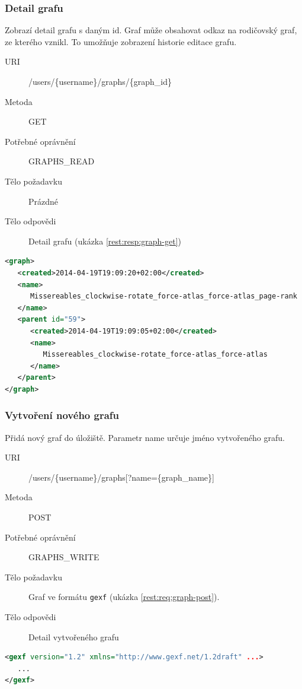 \documentclass[thesis=M,czech]{FITthesis}[2014/05/6]
\begin{document}
\subsubsection{Detail grafu}
Zobrazí detail grafu s daným id. Graf může obsahovat odkaz na rodičovský graf, ze kterého vznikl. To umožňuje zobrazení historie editace grafu.
\begin{description}
  \item[URI] /users/\{username\}/graphs/\{graph\_id\}
  \item[Metoda] GET
  \item[Potřebné oprávnění] GRAPHS\_READ
  \item[Tělo požadavku] Prázdné
  \item[Tělo odpovědi] Detail grafu (ukázka \ref{rest:resp:graph-get})
\end{description}

\begin{lstlisting}[caption=Tělo odpovědi zdroje /users/\{username\}/graphs/\{graph\_id\} (GET), label=rest:resp:graph-get, language=xml]
<graph>
   <created>2014-04-19T19:09:20+02:00</created>
   <name>
      Missereables_clockwise-rotate_force-atlas_force-atlas_page-rank
   </name>
   <parent id="59">
      <created>2014-04-19T19:09:05+02:00</created>
      <name>
         Missereables_clockwise-rotate_force-atlas_force-atlas
      </name>
   </parent>
</graph>
\end{lstlisting}  

\subsubsection{Vytvoření nového grafu}
Přidá nový graf do úložiště. Parametr name určuje jméno vytvořeného grafu.
\begin{description}
  \item[URI] /users/\{username\}/graphs[?name=\{graph\_name\}]
  \item[Metoda] POST
  \item[Potřebné oprávnění] GRAPHS\_WRITE
  \item[Tělo požadavku] Graf ve formátu \texttt{gexf} (ukázka \ref{rest:req:graph-post}).
  \item[Tělo odpovědi] Detail vytvořeného grafu
\end{description}

\begin{lstlisting}[caption=Tělo požadavku zdroje /users/\{username\}/graphs (POST), label=rest:req:graph-post, language=xml]
<gexf version="1.2" xmlns="http://www.gexf.net/1.2draft" ...>
   ...
</gexf>
\end{lstlisting} 
\end{document}
